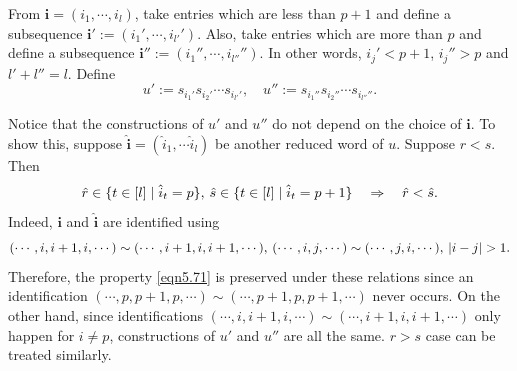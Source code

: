 \documentclass[12pt]{amsart}
\theoremstyle{definition}
\theoremstyle{remark}
\newcommand{\hsp}{\hspace{0.2em}}
\begin{document}
From $\mathbf{i} = (i_1 , \cdots , i_l)$, take entries which are less than $p+1$ and define a subsequence $\mathbf{i}' := (i_1 ' , \cdots , i_{l'}')$. Also, take entries which are more than $p$ and define a subsequence $\mathbf{i}'' := (i_1 '' , \cdots , i_{l''}'')$. In other words, $i_j' < p+1$, $i_j '' > p$ and $l' + l'' = l$. Define
\begin{equation}\label{eqn6.23}
u' := s_{i_1'} s_{i_2'} \cdots s_{i_{l'}'},  \quad u'' := s_{i_1''} s_{i_2''} \cdots s_{i_{l''}''}.
\end{equation}

Notice that the constructions of $u'$ and $u''$ do not depend on the choice of $\mathbf{i}$. To show this, suppose $\mathbf{\hat{i}} = (\hat{i}_1 , \cdots \hat{i}_l)$ be another reduced word of $u$. Suppose $r <s$. Then
\begin{equation}\label{eqn5.71}
\hat{r} \in \{ t \in [l] \mid \hat{i}_t = p \} , \hsp \hat{s} \in \{ t \in [l] \mid \hat{i}_t = p+1 \} \quad \Rightarrow \quad \hat{r} < \hat{s}.
\end{equation}
Indeed, $\mathbf{i}$ and $\mathbf{\hat{i}}$ are identified using
\begin{equation}
(\cdots , i , i+1 , i , \cdots ) \sim ( \cdots , i+1 , i , i+1 , \cdots ) , \hsp (\cdots , i , j , \cdots ) \sim ( \cdots , j , i , \cdots ) , \hsp |i-j|>1.
\end{equation}
Therefore, the property \eqref{eqn5.71} is preserved under these relations since an identification $( \cdots , p , p+1 , p , \cdots) \sim ( \cdots , p+1 , p, p+1 , \cdots)$ never occurs. On the other hand, since identifications $(\cdots , i , i+1 , i , \cdots ) \sim (\cdots , i+1 , i , i+1 , \cdots )$ only happen for $i \neq p$, constructions of $u'$ and $u''$ are all the same. $r>s$ case can be treated similarly.
\end{document}
